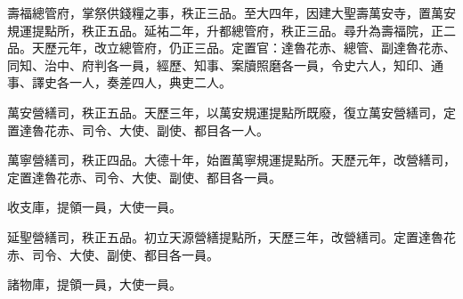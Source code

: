 \begin{pinyinscope}
 壽福總管府，掌祭供錢糧之事，秩正三品。至大四年，因建大聖壽萬安寺，置萬安規運提點所，秩正五品。延祐二年，升都總管府，秩正三品。尋升為壽福院，正二品。天歷元年，改立總管府，仍正三品。定置官：達魯花赤、總管、副達魯花赤、同知、治中、府判各一員，經歷、知事、案牘照磨各一員，令史六人，知印、通事、譯史各一人，奏差四人，典吏二人。



 萬安營繕司，秩正五品。天歷三年，以萬安規運提點所既廢，復立萬安營繕司，定置達魯花赤、司令、大使、副使、都目各一人。



 萬寧營繕司，秩正四品。大德十年，始置萬寧規運提點所。天歷元年，改營繕司，定置達魯花赤、司令、大使、副使、都目各一員。



 收支庫，提領一員，大使一員。



 延聖營繕司，秩正五品。初立天源營繕提點所，天歷三年，改營繕司。定置達魯花赤、司令、大使、副使、都目各一員。



 諸物庫，提領一員，大使一員。



\end{pinyinscope}